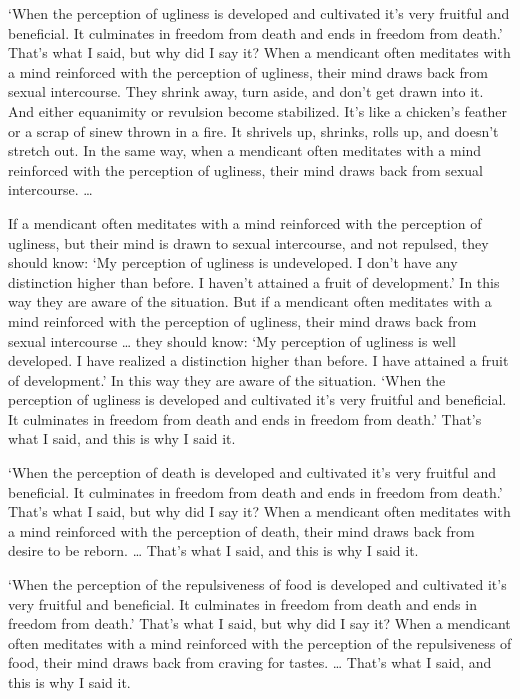 \documentclass[12pt,openany]{book}%
\begin{document}
‘When the perception of ugliness is developed and cultivated it’s very fruitful and beneficial. It culminates in freedom from death and ends in freedom from death.’ That’s what I said, but why did I say it? When a mendicant often meditates with a mind reinforced with the perception of ugliness, their mind draws back from sexual intercourse. They shrink away, turn aside, and don’t get drawn into it. And either equanimity or revulsion become stabilized. It’s like a chicken’s feather or a scrap of sinew thrown in a fire. It shrivels up, shrinks, rolls up, and doesn’t stretch out. In the same way, when a mendicant often meditates with a mind reinforced with the perception of ugliness, their mind draws back from sexual intercourse. … 

If a mendicant often meditates with a mind reinforced with the perception of ugliness, but their mind is drawn to sexual intercourse, and not repulsed, they should know: ‘My perception of ugliness is undeveloped. I don’t have any distinction higher than before. I haven’t attained a fruit of development.’ In this way they are aware of the situation. But if a mendicant often meditates with a mind reinforced with the perception of ugliness, their mind draws back from sexual intercourse … they should know: ‘My perception of ugliness is well developed. I have realized a distinction higher than before. I have attained a fruit of development.’ In this way they are aware of the situation. ‘When the perception of ugliness is developed and cultivated it’s very fruitful and beneficial. It culminates in freedom from death and ends in freedom from death.’ That’s what I said, and this is why I said it. 

‘When the perception of death is developed and cultivated it’s very fruitful and beneficial. It culminates in freedom from death and ends in freedom from death.’ That’s what I said, but why did I say it? When a mendicant often meditates with a mind reinforced with the perception of death, their mind draws back from desire to be reborn. … That’s what I said, and this is why I said it. 

‘When the perception of the repulsiveness of food is developed and cultivated it’s very fruitful and beneficial. It culminates in freedom from death and ends in freedom from death.’ That’s what I said, but why did I say it? When a mendicant often meditates with a mind reinforced with the perception of the repulsiveness of food, their mind draws back from craving for tastes. … That’s what I said, and this is why I said it. 
\end{document}
